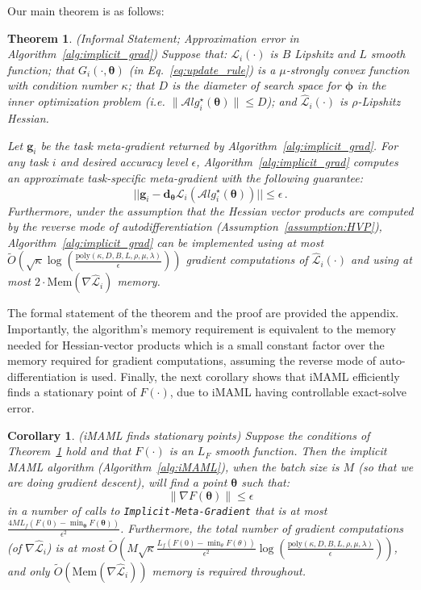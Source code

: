 \documentclass{article} \usepackage[nonatbib, final]{mod_neurips}
\newtheorem{theorem}{Theorem}
\newtheorem{corollary}{Corollary}
\newcommand{\param}{{\bm{\phi}}}               \newcommand{\paramspace}{\Phi}
\newcommand{\prior}{{\bm{\theta}}}               \newcommand{\priorspace}{\Theta}
\newcommand{\fn}{\mathcal{L}}                  \newcommand{\udfn}{\tilde{\fn}}        \newcommand{\fnht}{\hat{\fn}}        \newcommand{\ud}{\alg}
\newcommand{\algstar}{\mathcal{A}lg^\star}
\newcommand{\eps}{\epsilon}
\newcommand{\grad}{\bm{d}}
\newcommand{\pgrad}{\nabla}
\begin{document}
Our main theorem is as follows:

\begin{theorem}
\label{thm:approx_error}
(Informal Statement; Approximation error in Algorithm~\ref{alg:implicit_grad})
Suppose that: $\fn_i(\cdot)$ is $B$ Lipshitz and $L$ smooth function; that $G_i(\cdot,\prior)$ (in
Eq.~\ref{eq:update_rule}) is a $\mu$-strongly convex function with
condition number $\kappa$; that $D$ is the diameter of search space for
$\param$ in the inner optimization problem (i.e. $\|\algstar_i(\prior)
\|\leq D$);  and $\fnht_i (\cdot)$ is $\rho$-Lipshitz Hessian.

Let $\bm{g}_i$ be the task meta-gradient returned by
Algorithm~\ref{alg:implicit_grad}. For any task $i$ and desired
accuracy level $\epsilon$, Algorithm~\ref{alg:implicit_grad} computes
an approximate task-specific meta-gradient with the following guarantee:
\[
  ||\bm{g}_i - \grad_\prior \fn_i(\algstar_i(\prior))|| \leq \epsilon\, .
\]
Furthermore, under the assumption that the Hessian
vector products are computed by the reverse mode of
autodifferentiation (Assumption~\ref{assumption:HVP}),  Algorithm~\ref{alg:implicit_grad} can be implemented using at most $\tilde{O}\left( \sqrt{\kappa} \log \left(
\frac{\textrm{poly}(\kappa,D,B,L,\rho,\mu,\lambda)}{\epsilon}
\right) \right)$ gradient computations of $\fnht_i (\cdot) $ and using
at most $2\cdot \mathrm{Mem}(\pgrad \fnht_i)$ memory.
\end{theorem}

The formal statement of the theorem and the proof are provided the
appendix. Importantly, the algorithm's memory requirement is
equivalent to the memory needed for Hessian-vector products which is a
small constant factor over the memory required for gradient
computations, assuming the reverse mode of
auto-differentiation is used. 
Finally, the next corollary shows that iMAML efficiently finds a
stationary point of $F(\cdot)$, due to iMAML having 
controllable exact-solve error.

\begin{corollary} (iMAML finds stationary points)
Suppose the conditions of Theorem~\ref{thm:approx_error} hold and that
$F(\cdot)$ is an $L_F$ smooth function. Then
the implicit MAML algorithm (Algorithm~\ref{alg:iMAML}), when the
batch size is $M$ (so that we are doing gradient descent), will find a
point $\prior$ such that:
\[
\|\nabla F(\prior) \| \leq \eps
\]
in a number of calls to \texttt{Implicit-Meta-Gradient} that is at
most $\frac{4M L_f (F(0) - \min_\prior F(\prior))}{\eps^2}$.
Furthermore, the total number of gradient computations (of $\pgrad
\fnht_i$) is  at most $\tilde{O}\left( M \sqrt{\kappa} \frac{L_f (F(0) -
\min_\theta F(\theta))}{\eps^2} \log \left(
\frac{\textrm{poly}(\kappa,D,B,L,\rho,\mu,\lambda)}{\epsilon}
\right) \right)$, and only $\tilde{O}(\mathrm{Mem}(\pgrad \fnht_i))$ memory is required throughout.
\end{corollary}
\end{document}
